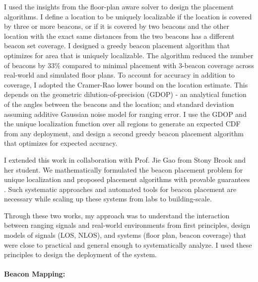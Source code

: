 \documentclass[10pt]{article}
\begin{document}
I used the insights from the floor-plan aware solver to design the placement algorithms. 
I define a location to be uniquely localizable if the location is covered by three or more beacons, or if it is covered by two beacons and the other location with the exact same distances from the two beacons has a different beacon set coverage. I designed a greedy beacon placement algorithm that optimizes for area that is uniquely localizable.  The algorithm reduced the number of beacons by $33\%$ compared to minimal placement with 3-beacon coverage across real-world and simulated floor plans. 
To account for accuracy in addition to coverage, I adopted the Cramer-Rao lower bound on the location estimate. This depends on the geometric dilution-of-precision (GDOP) - an analytical function of the angles between the beacons and the location; and standard deviation assuming additive Gaussian noise model for ranging error. I use the GDOP and the unique localization function over all regions to generate an expected CDF from any deployment, and design a second greedy beacon placement algorithm that optimizes for expected accuracy.  

I extended this work in collaboration with
Prof. Jie Gao from Stony Brook and her student. We mathematically
formulated the beacon placement problem for unique localization and proposed placement
algorithms with provable guarantees \cite{beaconplacementtheory}. Such systematic approaches and automated tools for beacon
placement are necessary while scaling up these systems from labs to
building-scale. 

Through these two works, my approach was to understand the interaction between ranging signals and real-world environments from first principles, design models of signals (LOS, NLOS), and systems (floor plan, beacon coverage) that were close to practical and general enough to systematically analyze. I used these principles to design the deployment of the system. 

\paragraph{Beacon Mapping: }
\end{document}
